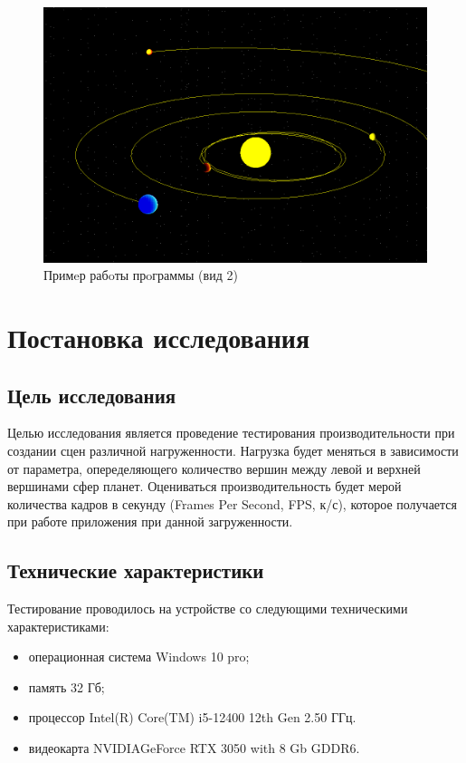\begin{figure}[H]
	\begin{center}
		\includegraphics[scale=0.4]{img/ex3.png}
	\end{center}
	\captionsetup{justification=centering}
	\caption{Примeр рабoты прoграммы (вид 2)}
	\label{img:ex2}
\end{figure}


\section{Постановка исследования}

\subsection{Цель исследования}

Целью исследования является проведение тестирования производительности при создании сцен различной нагруженности. Нагрузка будет меняться
в зависимости от параметра, опеределяющего количество вершин между левой и верхней вершинами сфер планет.
Оцениваться производительность будет мерой количества кадров в секунду (Frames Per Second, FPS, к/с), которое получается при работе приложения
при данной загруженности.


\subsection{Технические характеристики}

Тестирование проводилось на устройстве со следующими техническими характеристиками:

\begin{itemize}
	\item операционная система Windows 10 pro\cite{windows};
	\item память 32 Гб;
	\item процессор Intel(R) Core(TM) i5-12400 12th Gen 2.50 ГГц.
	\item видеокарта NVIDIAGeForce RTX 3050 with 8 Gb GDDR6. 
\end{itemize}

